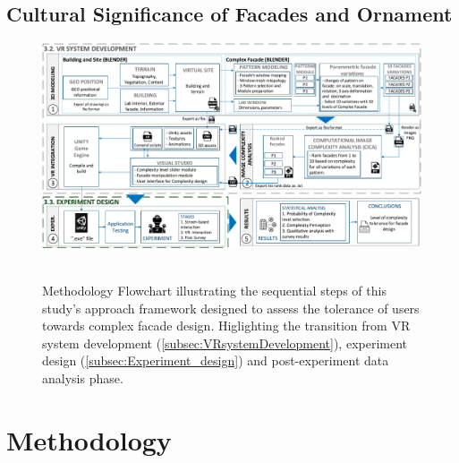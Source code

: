 \documentclass[final,5p,times]{elsarticle}%
\begin{document}
\begin{linenumbers}
    \subsection{Cultural Significance of Facades and Ornament}
    \label{subsec:FacadeandOrnament}
    


            \begin{figure}[!htb]
                \centering
                \includegraphics[width= \linewidth]{Images/MethodologyFlowchart}~\caption{Methodology Flowchart illustrating the sequential steps of this study's approach framework designed to assess the tolerance of users towards complex facade design. Higlighting the transition from VR system development (\ref{subsec:VRsystemDevelopment}), experiment design (\ref{subsec:Experiment_design}) and post-experiment data analysis phase. }
                  \label{fig:MethodologyFlowchart}
            \end{figure}

\section{Methodology}
\label{sec:Methodology}



\end{linenumbers}
\end{document}

